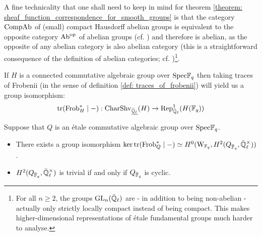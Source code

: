             \begin{remark} \label{remark: the_category_of_compact_hausdorff_abelian_groups}
                A fine technicality that one shall need to keep in mind for theorem \ref{theorem: sheaf_function_correspondence_for_smooth_groups} is that the category $\mathrm{Comp}\mathrm{Ab}$ of (small) compact Hausdorff abelian groups is equivalent to the opposite category $\mathrm{Ab}^{\mathrm{op}}$ of abelian groups (cf. \cite[Proposition IV.5.2]{maclane}) and therefore is abelian, as the opposite of any abelian category is also abelian category (this is a straightforward consequence of the definition of abelian categories; cf. \cite[Section VIII.3]{maclane})\footnote{For all $n \geq 2$, the groups $\operatorname{GL}_n(\bar{\mathbb{Q}}_{\ell})$ are - in addition to being non-abelian - actually only strictly locally compact instead of being compact. This makes higher-dimensional representations of \'etale fundamental groups much harder to analyse.}.
            \end{remark}
            \begin{lemma} \label{lemma: sheaf_function_correspondence_for_connected_algebraic_groups}
                \cite[Proposition 1.14]{cunningham_roe_function_sheaf_dictionary_quasi_characters_p_adic_tori} If $H$ is a connected commutative algebraic group over $\mathrm{Spec} \mathbb{F}_q$ then taking traces of Frobenii (in the sense of definition \ref{def: traces_of_frobenii}) will yield us a group isomorphism:
                    $$\operatorname{tr}(\mathrm{Frob}_H^* \mid -): \mathrm{Char}\mathrm{Shv}_{\underline{\bar{\mathbb{Q}}_{\ell}}}(H) \to \mathrm{Rep}_{\bar{\mathbb{Q}}_{\ell}}^1(H(\mathbb{F}_q))$$
            \end{lemma}
            \begin{lemma} \label{lemma: sheaf_function_correspondence_for_etale_commutative_group_schemes}
                Suppose that $Q$ is an \'etale commutative algebraic group over $\mathrm{Spec} \mathbb{F}_q$.
                \begin{itemize}
                    \item \cite[Proposition 2.7]{cunningham_roe_function_sheaf_dictionary_quasi_characters_p_adic_tori} There exists a group isomorphism $\ker \trace(\Frob_Q^* \mid -) \cong H^0(\rmW_{\F_q}, H^2(Q_{\bar{\F}_q}, \bar{\Q}_{\ell}^{\x}))$. 
                    \item \cite[Remark 2.9]{cunningham_roe_function_sheaf_dictionary_quasi_characters_p_adic_tori} $H^2(Q_{\bar{\F}_q}, \bar{\Q}_{\ell}^{\x})$ is trivial if and only if $Q_{\bar{\mathbb{F}}_q}$ is cyclic.
                \end{itemize}
            \end{lemma}
